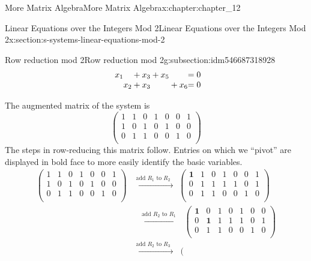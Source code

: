 \documentclass[oneside,10pt,]{book}
\numberwithin{equation}{section}
\begin{document}
\begin{chapterptx}{More Matrix Algebra}{}{More Matrix Algebra}{}{}{x:chapter:chapter_12}
\begin{sectionptx}{Linear Equations over the Integers Mod 2}{}{Linear Equations over the Integers Mod 2}{}{}{x:section:s-systems-linear-equations-mod-2}
\begin{subsectionptx}{Row reduction mod 2}{}{Row reduction mod 2}{}{}{g:subsection:idm546687318928}
\begin{equation*}
\begin{array}{r@{}r@{}r@{}r@{}r@{}r@{}r@{}r@{}r@{}r@{}r@{}r@{}}
x_1 &      &    & {}+{}&x_3 &      &      &{}+{} & x_5&     &   &= 0 \\
&      & x_2& {}+{}&x_3 &      &      &      &    &{}+{}&x_6&= 0 \\
\end{array}
\end{equation*}
%
\par
The augmented  matrix of the  system is%
\begin{equation*}
\left(
\begin{array}{cccccc|c}
1 & 1 & 0 &  1 & 0 & 0 & 1 \\
1 & 0 & 1 &  0 & 1 & 0 & 0 \\
0 & 1 & 1 &  0 & 0 & 1 & 0 \\
\end{array}
\right)
\end{equation*}
The steps in row-reducing this matrix follow.  Entries on which we ``pivot'' are displayed in bold face to more easily identify the basic variables.%
\begin{equation*}
\begin{split}
\left(
\begin{array}{cccccc|c}
1 & 1 & 0 &  1 & 0 & 0 & 1 \\
1 & 0 & 1 &  0 & 1 & 0 & 0 \\
0 & 1 & 1 &  0 & 0 & 1 & 0 \\
\end{array}
\right) & \overset{\textrm{add }R_1\textrm{ to }R_2}{\text{  }\longrightarrow }\text{   }
\left(
\begin{array}{cccccc|c}
\textbf{1} & 1 & 0 &  1 & 0 & 0 & 1 \\
0 & 1 & 1 &  1 & 1 & 0 & 1 \\
0 & 1 & 1 &  0 & 0 & 1 & 0 \\
\end{array}
\right)\\
& \text{         }\overset{\textrm{add }R_2\textrm{ to }R_1}{\text{  }\longrightarrow }\text{    }\left(
\begin{array}{cccccc|c}
\textbf{1} & 0 & 1 &  0 & 1& 0 & 0 \\
0 & \textbf{1} & 1 &  1 & 1 & 0 & 1 \\
0 & 1 & 1 &  0 & 0 & 1 & 0 \\
\end{array}
\right) \\
& \overset{\textrm{add }R_2\textrm{ to }R_3}{\text{  }\longrightarrow }\text{    }
\left(
\begin{array}{cccccc|c}

\end{array}
\end{split}
\end{equation*}
\end{subsectionptx}
\end{sectionptx}
\end{chapterptx}
\end{document}

